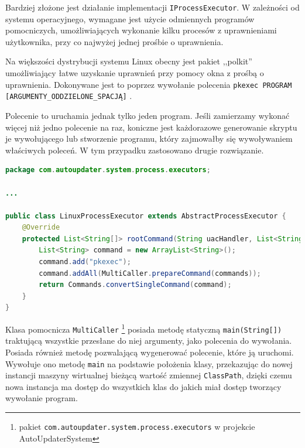 \documentclass[polish,12pt,titlepage]{article}
\begin{document}
Bardziej złożone jest działanie implementacji \texttt{IProcessExecutor}. W
zależności od systemu operacyjnego, wymagane jest użycie odmiennych programów
pomocniczych, umożliwiających wykonanie kilku procesów z uprawnieniami
użytkownika, przy co najwyżej jednej prośbie o uprawnienia.

Na większości dystrybucji systemu Linux obecny jest pakiet ,,polkit''
umożliwiający łatwe uzyskanie uprawnień przy pomocy okna z prośbą o
uprawnienia. Dokonywane jest to poprzez wywołanie polecenia \texttt{pkexec
PROGRAM [ARGUMENTY\_ODDZIELONE\_SPACJĄ]} \cite{LINUX_UPRAWNIENIA}.

Polecenie to uruchamia jednak tylko jeden program. Jeśli zamierzamy wykonać
więcej niż jedno polecenie na raz, koniczne jest każdorazowe generowanie
skryptu je wywołującego lub stworzenie programu, który zajmowałby się
wywoływaniem właściwych poleceń. W tym przypadku zastosowano drugie
rozwiązanie.

\begin{lstlisting}[language=Java, frame=lines, numberstyle=\tiny, stepnumber=5, caption=Implementacja \texttt{LinuxProcessExecutor}., firstnumber=1]
package com.autoupdater.system.process.executors;

...

public class LinuxProcessExecutor extends AbstractProcessExecutor {
    @Override
    protected List<String[]> rootCommand(String uacHandler, List<String[]> commands) {
        List<String> command = new ArrayList<String>();
        command.add("pkexec");
        command.addAll(MultiCaller.prepareCommand(commands));
        return Commands.convertSingleCommand(command);
    }
}
\end{lstlisting}

Klasa pomocnicza \texttt{MultiCaller} \footnote{pakiet
\texttt{com.autoupdater.system.process.executors} w projekcie
AutoUpdaterSystem} posiada metodę statyczną \texttt{main(String[])} traktującą
wszystkie przesłane do niej argumenty, jako polecenia do wywołania. Posiada
również metodę pozwalającą wygenerować polecenie, które ją uruchomi. Wywołuje
ono metodę \texttt{main} na podstawie położenia klasy, przekazując do nowej
instancji maszyny wirtualnej bieżącą wartość zmiennej \texttt{ClassPath},
dzięki czemu nowa instancja ma dostęp do wszystkich klas do jakich miał dostęp
tworzący wywołanie program.
\end{document}
